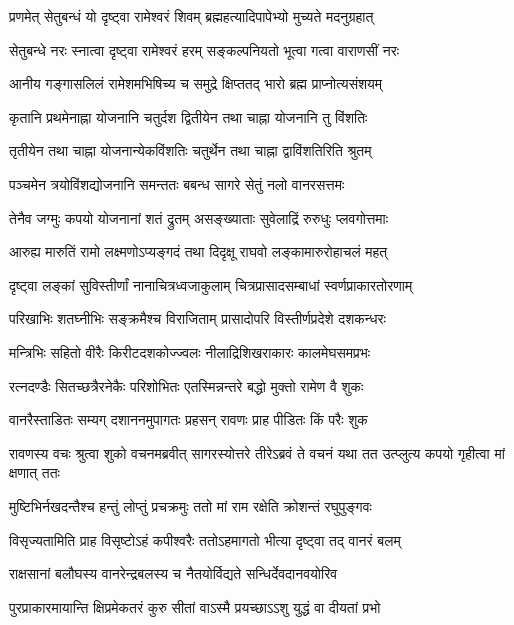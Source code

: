 \twolineshloka
{प्रणमेत् सेतुबन्धं यो दृष्ट्वा रामेश्वरं शिवम्}
{ब्रह्महत्यादिपापेभ्यो मुच्यते मदनुग्रहात्} %

\twolineshloka
{सेतुबन्धे नरः स्नात्वा दृष्ट्वा रामेश्वरं हरम्}
{सङ्कल्पनियतो भूत्वा गत्वा वाराणसीं नरः} %

\twolineshloka
{आनीय गङ्गासलिलं रामेशमभिषिच्य च}
{समुद्रे क्षिप्ततद् भारो ब्रह्म प्राप्नोत्यसंशयम्} %

\twolineshloka
{कृतानि प्रथमेनाह्ना योजनानि चतुर्दश}
{द्वितीयेन तथा चाह्ना योजनानि तु विंशतिः} %

\twolineshloka
{तृतीयेन तथा चाह्ना योजनान्येकविंशतिः}
{चतुर्थेन तथा चाह्ना द्वाविंशतिरिति श्रुतम्} %

\twolineshloka
{पञ्चमेन त्रयोविंशद्योजनानि समन्ततः}
{बबन्ध सागरे सेतुं नलो वानरसत्तमः} %

\twolineshloka
{तेनैव जग्मुः कपयो योजनानां शतं द्रुतम्}
{असङ्ख्याताः सुवेलाद्रिं रुरुधुः प्लवगोत्तमाः} %

\twolineshloka
{आरुह्य मारुतिं रामो लक्ष्मणोऽप्यङ्गदं तथा}
{दिदृक्षू राघवो लङ्कामारुरोहाचलं महत्} %

\twolineshloka
{दृष्ट्वा लङ्कां सुविस्तीर्णां नानाचित्रध्वजाकुलाम्}
{चित्रप्रासादसम्बाधां स्वर्णप्राकारतोरणाम्} %

\twolineshloka
{परिखाभिः शतघ्नीभिः सङ्क्रमैश्च विराजिताम्}
{प्रासादोपरि विस्तीर्णप्रदेशे दशकन्धरः} %

\twolineshloka
{मन्त्रिभिः सहितो वीरैः किरीटदशकोज्ज्वलः}
{नीलाद्रिशिखराकारः कालमेघसमप्रभः} %

\twolineshloka
{रत्नदण्डैः सितच्छत्रैरनेकैः परिशोभितः}
{एतस्मिन्नन्तरे बद्धो मुक्तो रामेण वै शुकः} %

\twolineshloka
{वानरैस्ताडितः सम्यग् दशाननमुपागतः}
{प्रहसन् रावणः प्राह पीडितः किं परैः शुक} %

\threelineshloka
{रावणस्य वचः श्रुत्वा शुको वचनमब्रवीत्}
{सागरस्योत्तरे तीरेऽब्रवं ते वचनं यथा}
{तत उत्प्लुत्य कपयो गृहीत्वा मां क्षणात् ततः} %

\twolineshloka
{मुष्टिभिर्नखदन्तैश्च हन्तुं लोप्तुं प्रचक्रमुः}
{ततो मां राम रक्षेति क्रोशन्तं रघुपुङ्गवः} %

\twolineshloka
{विसृज्यतामिति प्राह विसृष्टोऽहं कपीश्वरैः}
{ततोऽहमागतो भीत्या दृष्ट्वा तद् वानरं बलम्} %

\twolineshloka
{राक्षसानां बलौघस्य वानरेन्द्रबलस्य च}
{नैतयोर्विद्यते सन्धिर्देवदानवयोरिव} %

\twolineshloka
{पुरप्राकारमायान्ति क्षिप्रमेकतरं कुरु}
{सीतां वाऽस्मै प्रयच्छाऽऽशु युद्धं वा दीयतां प्रभो} %

